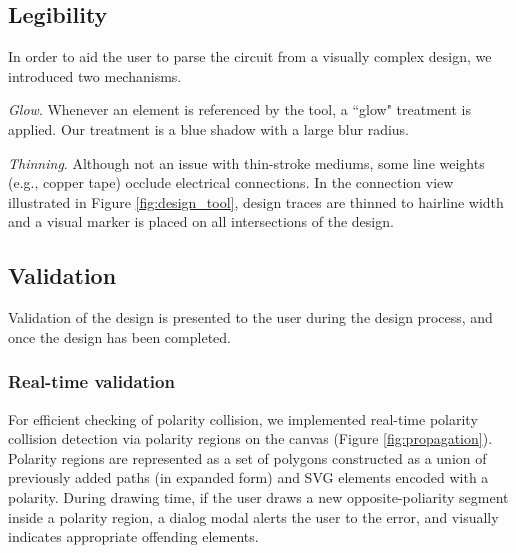 \documentclass{sigchi}
\begin{document}
    \noindent{}
    
    \subsection{Legibility}
        In order to aid the user to parse the circuit from a visually complex design, we introduced two mechanisms. 
        
        \textit{Glow}. Whenever an element is referenced by the tool, a ``glow" treatment is applied. Our treatment is a blue shadow with a large blur radius. 
        
        \textit{Thinning}. Although not an issue with thin-stroke mediums, some line weights (e.g., copper tape) occlude electrical connections. In the connection view illustrated in Figure \ref{fig:design_tool}, design traces are thinned to hairline width and a visual marker is placed on all intersections of the design.
        
\subsection{Validation}
    Validation of the design is presented to the user during the design process, and once the design has been completed. %
    \subsubsection{Real-time validation}
        For efficient checking of polarity collision, we implemented real-time polarity collision detection via polarity regions on the canvas (Figure \ref{fig:propagation}). Polarity regions are represented as a set of polygons constructed as a union of previously added paths (in expanded form) and SVG elements encoded with a polarity. During drawing time, if the user draws a new opposite-poliarity segment inside a polarity region, a dialog modal alerts the user to the error, and visually indicates appropriate offending elements.
\end{document}
